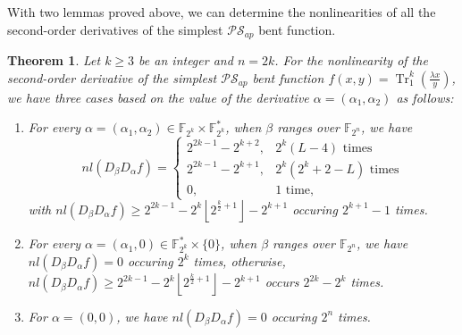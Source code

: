 \documentclass{article}
\newcommand{\F}{\mathbb{F}}
\newcommand{\0}{\textbf{0}}
\newcommand{\1}{\textbf{1}}
\newcommand{\TRACE}{\operatorname{Tr}_1^k}
\theoremstyle{plain}
\newtheorem{theorem}{Theorem}
\begin{document}
    With two lemmas proved above, we can determine the nonlinearities of all the second-order derivatives of the simplest $\mathcal{PS}_{ap}$ bent function.
    \begin{theorem}\label{thm:nl_DaDbf}
        Let $k\ge 3$ be an integer and $n=2k$.
        For the nonlinearity of the second-order derivative of
        the simplest $\mathcal{PS}_{ap}$ bent function $f(x,y)=\TRACE\left(\frac{\lambda x}{y}\right)$,
        we have three cases based on the value of the derivative $\alpha=(\alpha_1,\alpha_2)$ as follows:
        \begin{enumerate}[label=(\arabic{*})]
            \item For every $\alpha=(\alpha_1,\alpha_2)\in\F_{2^k}\times\F_{2^k}^*$,
            when $\beta$ ranges over $\F_{2^n}$, we have
            \begin{equation}\label{res:nontrivil_nl}
                nl(D_{\beta}D_{\alpha}f)=\begin{cases}
                    2^{2k-1}-2^{k+2},&2^k(L-4)\text{ times}\\
                    2^{2k-1}-2^{k+1},&2^k(2^k+2-L)\text{ times}\\
                    0,&1\text{ time},%
                \end{cases}
            \end{equation}
            with $nl(D_{\beta}D_{\alpha}f)\ge 2^{2k-1}-2^k\left\lfloor 2^{\frac{k}{2}+1}\right\rfloor-2^{k+1}$ occuring $2^{k+1}-1$ times.
            \item For every $\alpha=(\alpha_1,0)\in\F_{2^k}^*\times\{0\}$, when $\beta$ ranges over $\F_{2^n}$,
            we have $nl(D_{\beta}D_{\alpha}f)=0$ occuring $2^k$ times,
            otherwise, $nl(D_{\beta}D_{\alpha}f)\ge 2^{2k-1}-2^k\left\lfloor 2^{\frac{k}{2}+1}\right\rfloor-2^{k+1}$ occurs $2^{2k}-2^k$ times.
            \item For $\alpha=(0,0)$, we have $nl(D_{\beta}D_{\alpha}f) = 0$ occuring $2^n$ times.
        \end{enumerate}
    \end{theorem}
\end{document}
